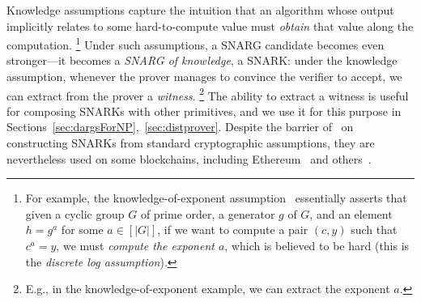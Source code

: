 Knowledge assumptions capture the intuition that an algorithm whose output implicitly relates to some
hard-to-compute value must \emph{obtain} that value along the computation.%
\footnote{For example, 
the knowledge-of-exponent assumption~\cite{KOE}
essentially asserts that given a cyclic group $G$ of prime order,
a generator $g$ of $G$, and an element $h = g^a$ for some $a \in [|G|]$,
if we want to compute a pair $(c,y)$ such that $c^a = y$,
we must \emph{compute the exponent $a$}, which is believed to be hard (this is the \emph{discrete log assumption}).}
Under such assumptions, a SNARG candidate becomes even stronger---it becomes
a \emph{SNARG of knowledge}, a SNARK:
under the knowledge assumption, whenever the prover manages to convince the verifier to accept,
we can extract from the prover a \emph{witness}.%
\footnote{E.g., in the knowledge-of-exponent example, we can extract the exponent $a$.}
The ability to extract a witness is useful for composing SNARKs with other primitives,
and we use it for this purpose in Sections~\ref{sec:dargsForNP},~\ref{sec:distprover}.
Despite the barrier of~\cite{gentry2011separating} on constructing
SNARKs from standard cryptographic assumptions, they are 
nevertheless used on some blockchains, including Ethereum~\cite{ZKSnarks} and others~\cite{filecoin,Zcash,Starkware}.




